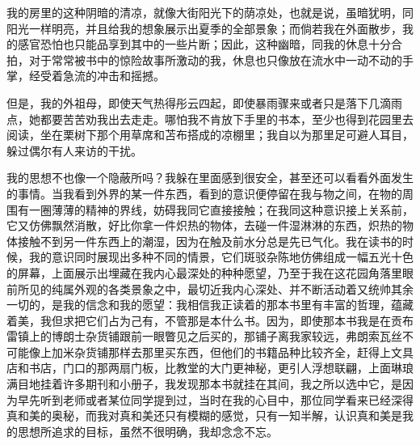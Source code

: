 \par 我的房里的这种阴暗的清凉，就像大街阳光下的荫凉处，也就是说，虽暗犹明，同阳光一样明亮，并且给我的想象展示出夏季的全部景象；而倘若我在外面散步，我的感官恐怕也只能品享到其中的一些片断；因此，这种幽暗，同我的休息十分合拍，对于常常被书中的惊险故事所激动的我，休息也只像放在流水中一动不动的手掌，经受着急流的冲击和摇撼。
\par 但是，我的外祖母，即使天气热得彤云四起，即使暴雨骤来或者只是落下几滴雨点，她都要苦苦劝我出去走走。哪怕我不肯放下手里的书本，至少也得到花园里去阅读，坐在栗树下那个用草席和苫布搭成的凉棚里；我自以为那里足可避人耳目，躲过偶尔有人来访的干扰。
\par 我的思想不也像一个隐蔽所吗？我躲在里面感到很安全，甚至还可以看看外面发生的事情。当我看到外界的某一件东西，看到的意识便停留在我与物之间，在物的周围有一圈薄薄的精神的界线，妨碍我同它直接接触；在我同这种意识接上关系前，它又仿佛飘然消散，好比你拿一件炽热的物体，去碰一件湿淋淋的东西，炽热的物体接触不到另一件东西上的潮湿，因为在触及前水分总是先已气化。我在读书的时候，我的意识同时展现出多种不同的情景，它们斑驳杂陈地仿佛组成一幅五光十色的屏幕，上面展示出埋藏在我内心最深处的种种愿望，乃至于我在这花园角落里眼前所见的纯属外观的各类景象之中，最切近我内心深处、并不断活动着又统帅其余一切的，是我的信念和我的愿望：我相信我正读着的那本书里有丰富的哲理，蕴藏着美，我但求把它们占为己有，不管那是本什么书。因为，即使那本书我是在贡布雷镇上的博朗士杂货铺跟前一眼瞥见之后买的，那铺子离我家较远，弗朗索瓦丝不可能像上加米杂货铺那样去那里买东西，但他们的书籍品种比较齐全，赶得上文具店和书店，门口的那两扇门板，比教堂的大门更神秘，更引人浮想联翩，上面琳琅满目地挂着许多期刊和小册子，我发现那本书就挂在其间，我之所以选中它，是因为早先听到老师或者某位同学提到过，当时在我的心目中，那位同学看来已经深得真和美的奥秘，而我对真和美还只有模糊的感觉，只有一知半解，认识真和美是我的思想所追求的目标，虽然不很明确，我却念念不忘。
